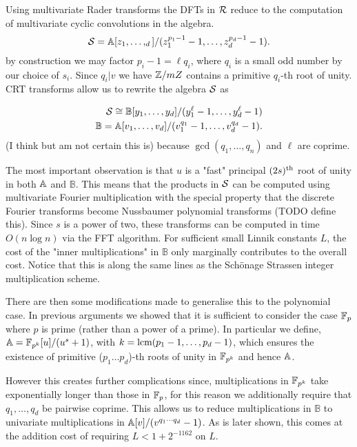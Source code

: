 Using multivariate Rader transforms the DFTs in $\mathcal R$ reduce to the computation of multivariate cyclic convolutions in the algebra.
\[
    \mathcal S = {\mathbb A}[z_1, \ldots, _d] / (z_1^{p_1 - 1} - 1, \ldots, z_d^{p_d - 1} - 1).
\]
by construction we may factor $p_i - 1 = \ell q_i$, where $q_i$ is a small odd number by our choice of $s_i$. Since $q_i | v$ we have ${\mathbb Z} /mZ$ contains a primitive $q_i$-th root of unity. CRT transforms allow us to rewrite the algebra $\mathcal S$ as

\begin{align*}
    \mathcal S \cong \mathbb{B}[y_1, \ldots, y_d]/(y_1^\ell - 1, \ldots, y_d^\ell - 1)\\
    \mathbb{B} = \mathbb{A}[v_1, \ldots, v_d] / (v_1^{q_1} - 1, \ldots, v_d^{q_d} - 1).
\end{align*}
(I think but am not certain this is) because $\gcd(q_1, \ldots, q_n)$ and $\ell$ are coprime.

The most important observation is that $u$ is a "fast" principal $(2s)^{\textrm{th}}$ root of unity in both ${\mathbb A}$ and $\mathbb{B}$. This means that the products in $\mathcal S$ can be computed using multivariate Fourier multiplication with the special property that the discrete Fourier transforms become Nussbaumer polynomial transforms (TODO define this). Since $s$ is a power of two, these transforms can be computed in time $O(n \log n)$ via the FFT algorithm. For sufficient small Linnik constants $L$, the cost of the "inner multiplications" in $\mathbb{B}$ only marginally contributes to the overall cost. Notice that this is along the same lines as the Sch\"{o}nage Strassen integer multiplication scheme.

There are then some modifications made to generalise this to the polynomial case. In previous arguments we showed that it is sufficient to consider the case ${\mathbb F}_p$ where $p$ is prime (rather than a power of a prime). In particular we define, ${\mathbb A} = {\mathbb F}_{p^k}[u] / (u^s + 1)$, with $k = \textrm{lcm}(p_1 - 1, \ldots, p_d - 1)$, which ensures the existence of primitive ($p_1 \ldots p_d$)-th roots of unity in ${\mathbb F}_{p^k}$ and hence ${\mathbb A}$.

However this creates further complications since, multiplications in ${\mathbb F}_{p^k}$ take exponentially longer than those in ${\mathbb F}_p$, for this reason we additionally require that $q_1, \ldots, q_d$ be pairwise coprime. This allows us to reduce multiplications in $\mathbb{B}$ to univariate multiplications in ${\mathbb A}[v]/(v^{q_1\cdots q_d} - 1)$. As is later shown, this comes at the addition cost of requiring $L < 1 + 2^{-1162}$ on $L$.

